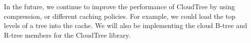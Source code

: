 \documentclass[10pt, conference, compsocconf]{IEEEtran}
\begin{document}
  In the future, we continue to improve the performance of CloudTree by using compression, 
  or different caching policies. For example, 
  we could load the top  levels of a tree into the cache. 
  We will also be implementing the cloud B-tree and R-tree members for the CloudTree library.



















\end{document}

